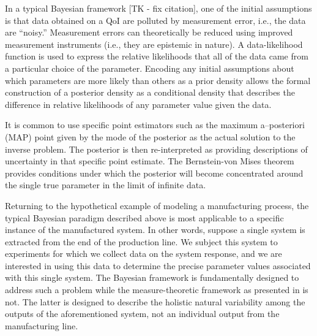 In a typical Bayesian framework [TK - fix citation]\cite{0266-5611-7-5-003,
  Kennedy_O_JRSSSB_2001,Tarantola_book, MNR07, CDS10,starktenorio,
  AlexanderianPetraStadlerEtAl14, Bui-ThanhGhattas14, Ernst2014,
  0266-5611-30-11-110301, ROM:CMW_2016,Stuart10,
  cockayneoatessullivangirolami}, one of the initial assumptions is that data obtained on a QoI are polluted by measurement error, i.e., the data are ``noisy.''
  Measurement errors can theoretically be reduced using improved measurement instruments (i.e., they are epistemic in nature).
  A data-likelihood function is used to express the relative likelihoods that all of the data came from a particular choice of the parameter.
  Encoding any initial assumptions about which parameters are more likely than others as a prior density allows the formal construction of a posterior density as a conditional density that describes the difference in relative likelihoods of any parameter value given the data.

It is common to use specific point estimators such as the maximum a--posteriori (MAP) point given by the mode of the posterior as the actual solution to the inverse problem.
The posterior is then re-interpreted as providing descriptions of uncertainty in that specific point estimate.
The Bernstein-von Mises theorem provides conditions under which the posterior will become concentrated around the single true parameter in the limit of infinite data\cite{Smith}.

Returning to the hypothetical example of modeling a manufacturing process, the typical Bayesian paradigm described above is most applicable to a specific instance of the manufactured system.
In other words, suppose a single system is extracted from the end of the production line.
We subject this system to experiments for which we collect data on the system response, and we are interested in using this data to determine the precise parameter values associated with this single system.
The Bayesian framework is fundamentally designed to address such a problem while the measure-theoretic framework as presented in \cite{BJW18a, BJW18b, BWY20} is not.
The latter is designed to describe the holistic natural variability among the outputs of the aforementioned system, not an individual output from the manufacturing line.

\FloatBarrier
